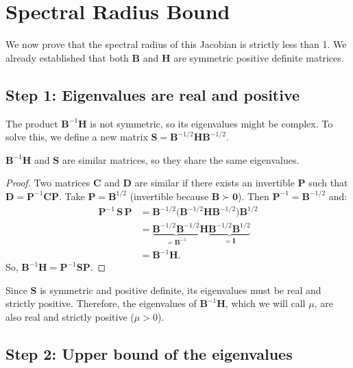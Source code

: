 \section{Spectral Radius Bound}
\label{app:sec:spectral}

We now prove that the spectral radius of this Jacobian is strictly less than 1. We already established that both $\mathbf{B}$ and $\mathbf{H}$ are symmetric positive definite matrices.

\subsection{Step 1: Eigenvalues are real and positive}
The product $\mathbf{B}^{-1}\mathbf{H}$ is not symmetric, so its eigenvalues might be complex. To solve this, we define a new matrix $\mathbf{S} = \mathbf{B}^{-1/2}\mathbf{H}\mathbf{B}^{-1/2}$.

\begin{lemma}
\label{app:lem:similar}
$\mathbf{B}^{-1}\mathbf{H}$ and $\mathbf{S}$ are similar matrices, so they share the same
eigenvalues.
\end{lemma}
\begin{proof}
Two matrices $\mathbf{C}$ and $\mathbf{D}$ are similar if there exists an invertible $\mathbf{P}$
such that $\mathbf{D}=\mathbf{P}^{-1}\mathbf{C}\mathbf{P}$.
Take $\mathbf{P}=\mathbf{B}^{1/2}$ (invertible because $\mathbf{B}\succ\mathbf{0}$).
Then $\mathbf{P}^{-1}=\mathbf{B}^{-1/2}$ and:
\begin{align*}
    \mathbf{P}^{-1}\,\mathbf{S}\,\mathbf{P}
    &= \mathbf{B}^{-1/2}
       \bigl(\mathbf{B}^{-1/2}\mathbf{H}\mathbf{B}^{-1/2}\bigr)
       \mathbf{B}^{1/2} \\
    &= \underbrace{\mathbf{B}^{-1/2}\mathbf{B}^{-1/2}}_{=\mathbf{B}^{-1}}
       \mathbf{H}
       \underbrace{\mathbf{B}^{-1/2}\mathbf{B}^{1/2}}_{=\mathbf{I}} \\
    &= \mathbf{B}^{-1}\mathbf{H}.
\end{align*}
So, $\mathbf{B}^{-1}\mathbf{H}=\mathbf{P}^{-1}\mathbf{S}\mathbf{P}$.
\end{proof}


Since $\mathbf{S}$ is symmetric and positive definite, its eigenvalues must be real and strictly positive. Therefore, the eigenvalues of $\mathbf{B}^{-1}\mathbf{H}$, which we will call $\mu$, are also real and strictly positive ($\mu > 0$).

\subsection{Step 2: Upper bound of the eigenvalues}

